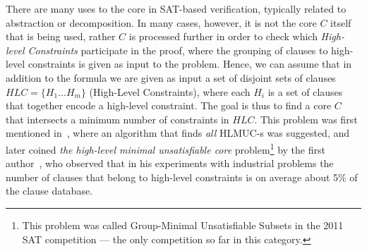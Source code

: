 \documentclass[twoside,11pt]{article}
\begin{document}
There are many uses to the core in SAT-based verification, typically related
to abstraction or decomposition. In many cases, however, it is not the core
$C$ itself that is being used, rather $C$ is processed further in order to
check which \emph{High-level Constraints} participate in the proof, where the
grouping of clauses to high-level constraints is given as input to the
problem. Hence, we can assume that in addition to the formula we are given as
input a set of disjoint sets of clauses $HLC =\{H_1\ldots H_m\}$ (High-Level
Constraints), where each $H_i$ is a set of clauses that together encode a
high-level constraint.  The goal is thus to find a core $C$ that intersects a minimum number of
constraints in $HLC$. This
problem was first mentioned in~\cite{LS08}, where an algorithm that finds \emph{all} HLMUC-s was suggested, and later coined \emph{the high-level
minimal unsatisfiable core} problem\footnote{This problem was called Group-Minimal Unsatisfiable Subsets in the 2011 SAT
competition --- the only competition so far in this category.} by the first author~\cite{N10}, who observed that in his experiments with industrial problems the number of clauses that belong to high-level constraints is on average about 5\% of the clause database.
\end{document}
